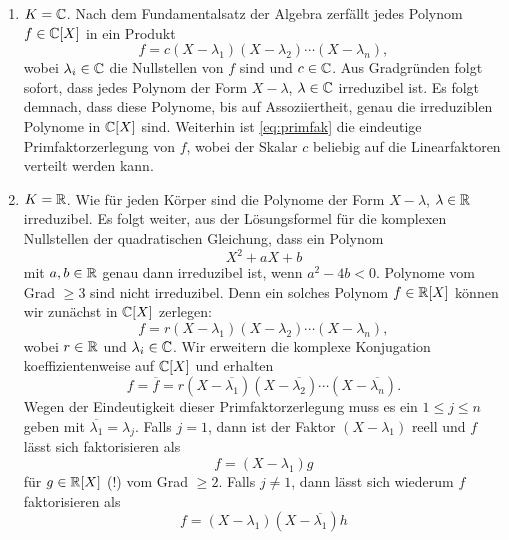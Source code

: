 \documentclass{book}
\begin{document}
\begin{exas}
    \label{exas:irred}
    \begin{enumerate}
        \item $K = \mathbb{C}$. Nach dem Fundamentalsatz der Algebra zerfällt jedes Polynom $f \in \mathbb{C}[X]$ in ein Produkt
            \begin{equation}
                    \label{eq:primfak}
                    f = c (X-\lambda_1) (X- \lambda_2) \cdots (X- \lambda_n),
            \end{equation}
            wobei $\lambda_i \in \mathbb{C}$ die Nullstellen von $f$ sind und $c \in
            \mathbb{C}$. Aus Gradgründen folgt sofort, dass jedes Polynom der Form $X-
            \lambda$, $\lambda \in \mathbb{C}$ irreduzibel ist. Es folgt demnach,
            dass diese Polynome, bis auf Assoziiertheit, genau die irreduziblen
            Polynome in $\mathbb{C}[X]$ sind. Weiterhin ist \eqref{eq:primfak} die
            eindeutige Primfaktorzerlegung von $f$, wobei der Skalar $c$
            beliebig auf die Linearfaktoren verteilt werden kann.
        \item $K = \mathbb{R}$. Wie für jeden Körper sind die Polynome der Form $X -
            \lambda$, $\lambda \in \mathbb{R}$ irreduzibel. Es folgt weiter, aus der
            Lösungsformel für die komplexen Nullstellen der quadratischen
            Gleichung, dass ein Polynom
            \[
                X^2 + a X + b 
            \]
            mit $a,b \in \mathbb{R}$ genau dann irreduzibel ist, wenn $a^2 - 4b < 0$.
            Polynome vom Grad $\ge 3$ sind nicht irreduzibel. Denn ein
            solches Polynom $f \in \mathbb{R}[X]$ können wir zunächst in $\mathbb{C}[X]$ zerlegen:
            \[
                f = r(X-\lambda_1)(X- \lambda_2) \cdots (X- \lambda_n),
            \]
            wobei $r \in \mathbb{R}$ und $\lambda_i \in \mathbb{C}$. Wir erweitern die komplexe Konjugation koeffizientenweise auf $\mathbb{C}[X]$ und erhalten 
            \[
                f = \overline{f} = r(X-\overline{\lambda_1})(X- \overline{\lambda_2}) \cdots (X- \overline{\lambda_n}).
            \]
            Wegen der Eindeutigkeit dieser Primfaktorzerlegung muss es ein $1
            \le j  \le n$ geben mit $\overline{\lambda_1} = \lambda_j$. Falls
            $j = 1$, dann ist der Faktor $(X-\lambda_1)$ reell und $f$ lässt sich faktorisieren als
            \[
                f = (X - \lambda_1) g
            \]
            für $g \in \mathbb{R}[X]$ (!) vom Grad $\ge 2$. Falls $j \neq 1$, dann lässt sich wiederum $f$ faktorisieren als
            \[
                f = (X- \lambda_1) (X - \overline{\lambda_1}) h
            \]

\end{enumerate}
\end{exas}
\end{document}
